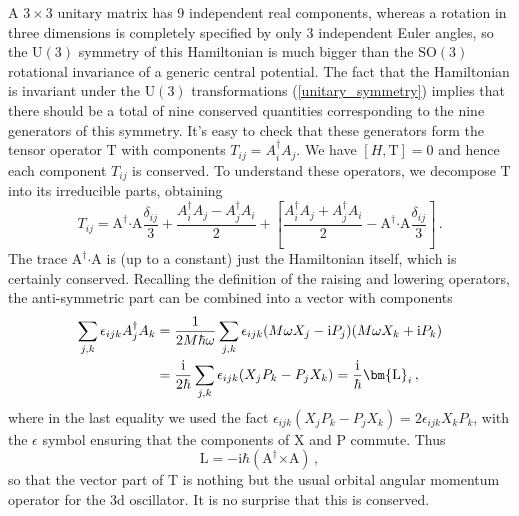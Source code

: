 \documentclass{article}
\theoremstyle{plain}\theoremheaderfont{\normalfont\itshape}\theorembodyfont{\rmfamily}\theoremseparator{.}\newtheorem*{rem}{Remark}\newtheorem*{ex}{Example}\newtheorem*{proof}{Proof}\newtheorem*{altp}{Alternative proof}
\theoremstyle{plain}\theoremheaderfont{\normalfont\bfseries}\theorembodyfont{\rmfamily}\theoremseparator{.}\newtheorem{thm}{Theorem}[section]\newtheorem{lem}[thm]{Lemma}\newtheorem{prop}[thm]{Proposition}\newtheorem*{cor}{Corollary}\newtheorem{defn}[thm]{Definition}\newtheorem{clm}[thm]{Claim}\newtheorem{clminproof}{Claim}
\theoremstyle{break}\theoremheaderfont{\normalfont\itshape}\theorembodyfont{\rmfamily}\theoremseparator{.\medskip}\newtheorem*{proofskip}{Proof}\newtheorem*{exs}{Examples}\newtheorem*{rems}{Remarks}
\theoremstyle{break}\theoremheaderfont{\normalfont\bfseries}\theorembodyfont{\rmfamily}\theoremseparator{.\medskip}\newtheorem{lemskip}[thm]{Lemma}\newtheorem{defnskip}[thm]{Definition}\newtheorem{propskip}[thm]{Proposition}\newtheorem{thmskip}[thm]{Theorem}
\numberwithin{equation}{section}
\newcommand{\ii}{\mathrm{i}}
\newcommand{\vb}[1]{\bm{\mathrm{#1}}}
\newcommand{\cross}{\bm{\times}}
\newcommand{\vdot}{\bm{\cdot}}
\newcommand{\SO}{\mathrm{SO}}
\newcommand{\U}{\mathrm{U}}
\begin{document}
    A \(3\times 3\) unitary matrix has 9 independent real components, whereas a rotation in three dimensions is completely specified by only 3 independent Euler angles, so the \(\U(3)\) symmetry of this Hamiltonian is much bigger than the \(\SO(3)\) rotational invariance of a generic central potential. The fact that the Hamiltonian is invariant under the \(\U(3)\) transformations (\ref{unitary_symmetry}) implies that there should be a total of nine conserved quantities corresponding to the nine generators of this symmetry. It's easy to check that these generators form the tensor operator \(\vb{T}\) with components \(T_{ij}=A^\dagger_iA_j\). We have \([H,\vb{T}]=0\) and hence each component \(T_{ij}\) is conserved. To understand these operators, we decompose \(\vb{T}\) into its irreducible parts, obtaining
    \begin{equation}
        T_{ij}=\vb{A}^\dagger\vdot\vb{A}\frac{\delta_{ij}}{3}+\frac{A_i^\dagger A_j-A_j^\dagger A_i}{2}+\left[\frac{A_i^\dagger A_j+A_j^\dagger A_i}{2}-\vb{A}^\dagger\vdot\vb{A}\frac{\delta_{ij}}{3}\right]\,.
    \end{equation}
    The trace \(\vb{A}^\dagger\vdot\vb{A}\) is (up to a constant) just the Hamiltonian itself, which is certainly conserved. Recalling the definition of the raising and lowering operators, the anti-symmetric part can be combined into a vector with components
    \begin{align}
        \sum_{j,k}\epsilon_{ijk}A_j^\dagger A_k&=\frac{1}{2M\hbar\omega}\sum_{j,k}\epsilon_{ijk}(M\omega X_j-\ii P_j)(M\omega X_k+\ii P_k)\notag\\
        &=\frac{\ii}{2\hbar}\sum_{j,k}\epsilon_{ijk}(X_jP_k-P_jX_k)=\frac{\ii}{\hbar}\vb{L}_i\,,
    \end{align}
    where in the last equality we used the fact \(\epsilon_{ijk}(X_j P_k-P_j X_k)=2\epsilon_{ijk}X_k P_k\), with the \(\epsilon\) symbol ensuring that the components of \(\vb{X}\) and \(\vb{P}\) commute. Thus
    \begin{equation}
        \vb{L}=-\ii\hbar(\vb{A}^\dagger\cross\vb{A})\,,
    \end{equation}
    so that the vector part of \(\vb{T}\) is nothing but the usual orbital angular momentum operator for the 3d oscillator. It is no surprise that this is conserved.
\end{document}
